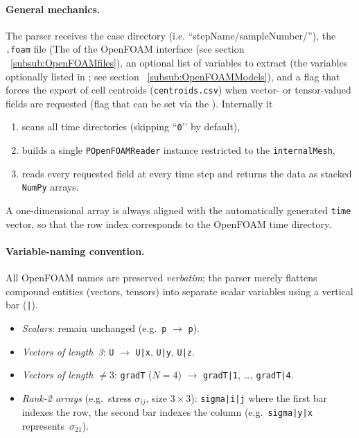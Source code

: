 \paragraph{General mechanics.}
The parser receives the case directory (i.e. ``stepName/sampleNumber/''), 
the \texttt{.foam} file (The  of the OpenFOAM interface (see section ~\ref{subsub:OpenFOAMfiles}), 
an optional list of variables to extract (the variables optionally listed in ; see section ~\ref{subsub:OpenFOAMModels}), and a flag that forces the export of cell
centroids (\texttt{centroids.csv}) when vector- or tensor-valued fields are
requested (flag that can be set via the ).  Internally it
\begin{enumerate}
  \item scans all time directories (skipping ``\texttt{0}’’ by default),
  \item builds a single \texttt{POpenFOAMReader} instance restricted to the
        \texttt{internalMesh},
  \item reads every requested field at every time step and returns the data
        as stacked \texttt{NumPy} arrays.
\end{enumerate}
A one-dimensional array is always aligned with the automatically generated
\texttt{time} vector, so that the row index corresponds to the OpenFOAM
time directory.

\paragraph{Variable-naming convention.}
All OpenFOAM names are preserved \emph{verbatim}; the parser merely flattens
compound entities (vectors, tensors) into separate scalar variables using a
vertical bar (\texttt{|}).

\begin{itemize}
\item \emph{Scalars}: remain unchanged  
  (e.g.\ \texttt{p} $\rightarrow$ \texttt{p}).
\item \emph{Vectors of length~3}:  
  \texttt{U} $\rightarrow$ \texttt{U|x}, \texttt{U|y}, \texttt{U|z}.
\item \emph{Vectors of length $\neq3$}:  
  \texttt{gradT} ($N\!=\!4$) $\rightarrow$ \texttt{gradT|1}, \dots, \texttt{gradT|4}.
\item \emph{Rank-2 arrays} (e.g.\ stress $\sigma_{ij}$, size $3\times3$):  
  \texttt{sigma|i|j} where the first bar indexes the row, the second bar
  indexes the column  
  (e.g.\ \texttt{sigma|y|x} represents~$\sigma_{21}$).
\end{itemize}

